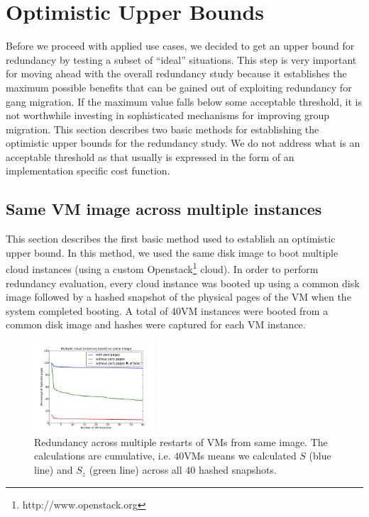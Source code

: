 \documentclass{acm_proc_article-sp}
\begin{document}
\section{Optimistic Upper Bounds}\label{sec:optimistic}
Before we proceed with applied use cases, we decided to get an upper bound for redundancy by testing a subset of ``ideal'' situations.  This step is very important for moving ahead with the overall redundancy study because it establishes the maximum possible benefits that can be gained out of exploiting redundancy for gang migration. If the maximum value falls below some acceptable threshold, it is not worthwhile investing in sophisticated mechanisms for improving group migration. This section describes two basic methods for establishing the optimistic upper bounds for the redundancy study.  We do not address what is an acceptable threshold as that usually is expressed in the form of an implementation specific cost function.

\subsection{Same VM image across multiple instances}
This section describes the first basic method used to establish an optimistic upper bound.  In this method, we used the same disk image to boot multiple cloud instances (using a custom Openstack\footnote{http://www.openstack.org} cloud). In order to perform redundancy evaluation, every cloud instance was booted up using a common disk image followed by a hashed snapshot of the physical pages of the VM when the system completed booting. A total of 40VM instances were booted from a common disk image and hashes were captured for each VM instance.

\begin{figure}
  \centering
  \includegraphics[width=0.4\textwidth]{images/samevm_multiplerestarts.pdf}
  \caption{Redundancy across multiple restarts of VMs from same image.  The calculations are cumulative, i.e. 40VMs means we calculated $S$ (blue line) and $S_z$ (green line) across all 40 hashed snapshots.}\label{fig:multiple_restarts}
\end{figure}
\end{document}
